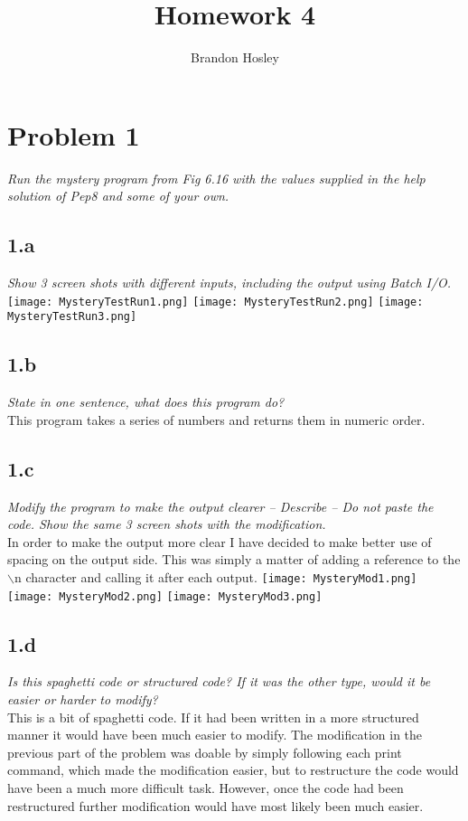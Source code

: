 \documentclass[a4paper,man,natbib]{apa6}
\title{Homework 4}
\author{Brandon Hosley}
\date{}
\affiliation{Mike Davis}
\begin{document}
\singlespacing
\raggedbottom
\maketitle
\section{Problem 1}
\emph{Run the mystery program from Fig 6.16 with the values supplied in the help solution of Pep8 and some of your own.}
\subsection{1.a}
\emph{Show 3 screen shots with different inputs, including the output using Batch I/O.} \\
\texttt{[image: MysteryTestRun1.png]}
\texttt{[image: MysteryTestRun2.png]}
\texttt{[image: MysteryTestRun3.png]}
\clearpage
\subsection{1.b}
\emph{State in one sentence, what does this program do?} \\
This program takes a series of numbers and returns them in numeric order. \\
\subsection{1.c}
\emph{Modify the program to make the output clearer – Describe – Do not paste the code. Show the same 3 screen shots with the modification.} \\
In order to make the output more clear I have decided to make better use of spacing on the output side. This was simply a matter of adding a reference to the $\backslash$n character and calling it after each output.
\texttt{[image: MysteryMod1.png]}
\texttt{[image: MysteryMod2.png]}
\texttt{[image: MysteryMod3.png]}
\clearpage
\subsection{1.d}
\emph{Is this spaghetti code or structured code? If it was the other type, would it be easier or harder to modify?}\\
This is a bit of spaghetti code. If it had been written in a more structured manner it would have been much easier to modify. The modification in the previous part of the problem was doable by simply following each print command, which made the modification easier, but to restructure the code would have been a much more difficult task. However, once the code had been restructured further modification would have most likely been much easier.
\clearpage
\end{document}
